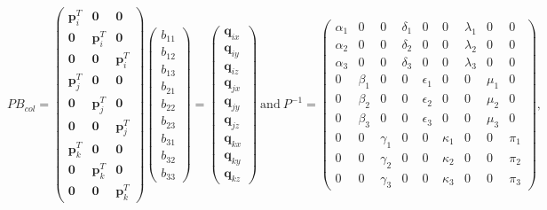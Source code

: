 \documentclass[12pt]{article}
\begin{document}
\begin{equation*}
PB_{col} = 
\begin{pmatrix}
 \mathbf{p}_i^T & \mathbf{0} & \mathbf{0} \\ 
 \mathbf{0} & \mathbf{p}_i^T & \mathbf{0}\\ 
 \mathbf{0} & \mathbf{0} & \mathbf{p}_i^T \\
  \mathbf{p}_j^T & \mathbf{0} & \mathbf{0} \\ 
 \mathbf{0} & \mathbf{p}_j^T & \mathbf{0}\\ 
 \mathbf{0} & \mathbf{0} & \mathbf{p}_j^T \\
  \mathbf{p}_k^T & \mathbf{0} & \mathbf{0} \\ 
 \mathbf{0} & \mathbf{p}_k^T & \mathbf{0}\\ 
 \mathbf{0} & \mathbf{0} & \mathbf{p}_k^T 
\end{pmatrix}
\begin{pmatrix}
b_{11} \\
b_{12} \\
b_{13} \\
b_{21} \\
b_{22} \\
b_{23} \\
b_{31} \\
b_{32} \\
b_{33}
\end{pmatrix} =
\begin{pmatrix} 
\mathbf{q}_{ix} \\
\mathbf{q}_{iy} \\
\mathbf{q}_{iz} \\
\mathbf{q}_{jx} \\
\mathbf{q}_{jy} \\
\mathbf{q}_{jz} \\
\mathbf{q}_{kx} \\
\mathbf{q}_{ky} \\
\mathbf{q}_{kz}
\end{pmatrix} ~
\text{and} ~
P^{-1} = 
\begin{pmatrix}
\alpha_1 & 0 & 0 & \delta_1 & 0 & 0 & \lambda_1 & 0 & 0 \\
\alpha_2 & 0 & 0 & \delta_2 & 0 & 0 & \lambda_2 & 0 & 0 \\
\alpha_3 & 0 & 0 & \delta_3 & 0 & 0 & \lambda_3 & 0 & 0 \\
0 & \beta_1 & 0 & 0 & \epsilon_1 & 0 & 0 & \mu_1 & 0 \\
0 & \beta_2 & 0 & 0 & \epsilon_2 & 0 & 0 & \mu_2 & 0 \\
0 & \beta_3 & 0 & 0 & \epsilon_3 & 0 & 0 & \mu_3 & 0 \\
0 & 0 & \gamma_1 & 0 & 0 & \kappa_1 & 0 & 0 & \pi_1 \\
0 & 0 & \gamma_2 & 0 & 0 & \kappa_2 & 0 & 0 & \pi_2  \\
0 & 0 & \gamma_3 & 0 & 0 & \kappa_3 & 0 & 0 & \pi_3
\end{pmatrix},
\end{equation*}
\end{document}
